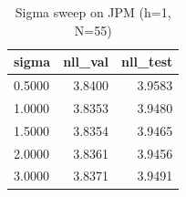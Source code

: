 \begin{table}[ht]
\centering
\caption{Sigma sweep on JPM (h=1, N=55)}
\label{tab:sigma}
\begin{tabular}{lrr}
\toprule
sigma & nll_val & nll_test \\
\midrule
0.5000 & 3.8400 & 3.9583 \\
1.0000 & 3.8353 & 3.9480 \\
1.5000 & 3.8354 & 3.9465 \\
2.0000 & 3.8361 & 3.9456 \\
3.0000 & 3.8371 & 3.9491 \\
\bottomrule
\end{tabular}
\end{table}